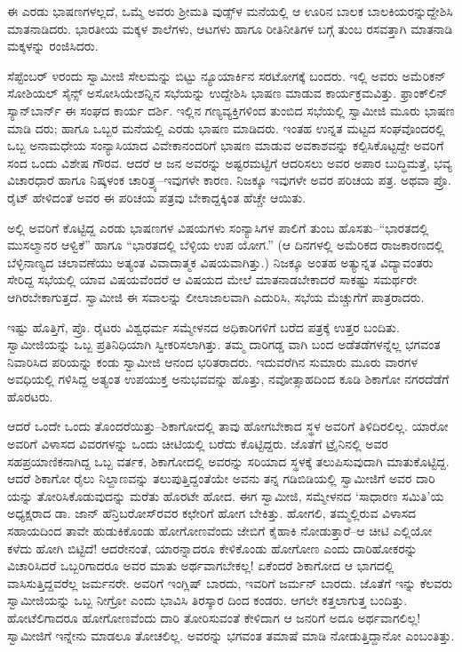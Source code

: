 ಈ ಎರಡು ಭಾಷಣಗಳಲ್ಲದೆ, ಒಮ್ಮೆ ಅವರು ಶ್ರೀಮತಿ ವುಡ್ಸ್​ಳ ಮನೆಯಲ್ಲಿ ಆ ಊರಿನ ಬಾಲಕ ಬಾಲಕಿಯರನ್ನುದ್ದೇಶಿಸಿ ಮಾತನಾಡಿದರು. ಭಾರತೀಯ ಮಕ್ಕಳ ಶಾಲೆಗಳು, ಆಟಗಳು ಹಾಗೂ ರೀತಿನೀತಿಗಳ ಬಗ್ಗೆ ತುಂಬ ರಸವತ್ತಾಗಿ ಮಾತನಾಡಿ ಮಕ್ಕಳನ್ನು ರಂಜಿಸಿದರು.

ಸೆಪ್ಟೆಂಬರ್ ೪ರಂದು ಸ್ವಾಮೀಜಿ ಸೇಲಮನ್ನು ಬಿಟ್ಟು ನ್ಯೂಯಾರ್ಕಿನ ಸರಟೋಗಕ್ಕೆ ಬಂದರು. ಇಲ್ಲಿ ಅವರು ಅಮೆರಿಕನ್ ಸೋಶಿಯಲ್ ಸೈನ್ಸ್ ಅಸೋಸಿಯೇಶನ್ನಿನ ಸಭೆಯನ್ನು ಉದ್ದೇಶಿಸಿ ಭಾಷಣ ಮಾಡುವ ಕಾರ್ಯಕ್ರಮವಿತ್ತು. ಫ್ರಾಂಕ್​ಲಿನ್ ಸ್ಯಾನ್​ಬಾರ್ನ್ ಈ ಸಂಘದ ಕಾರ್ಯ ದರ್ಶಿ. ಇಲ್ಲಿನ ಗಣ್ಯವ್ಯಕ್ತಿಗಳಿಂದ ತುಂಬಿದ ಸಭೆಯಲ್ಲಿ ಸ್ವಾಮೀಜಿ ಮೂರು ಭಾಷಣ ಮಾಡಿ ದರು; ಹಾಗೂ ಒಬ್ಬರ ಮನೆಯಲ್ಲಿ ಎರಡು ಭಾಷಣ ಮಾಡಿದರು. ಇಂತಹ ಉನ್ನತ ಮಟ್ಟದ ಸಂಘವೊಂದರಲ್ಲಿ ಒಬ್ಬ ಅನಾಮಧೇಯ ಸಂನ್ಯಾಸಿಯಾದ ವಿವೇಕಾನಂದರಿಗೆ ಭಾಷಣ ಮಾಡುವ ಅವಕಾಶವನ್ನು ಕಲ್ಪಿಸಿಕೊಟ್ಟದ್ದೇ ಅವರಿಗೆ ಸಂದ ಒಂದು ವಿಶೇಷ ಗೌರವ. ಆದರೆ ಆ ಜನ ಅವರನ್ನು ಅಷ್ಟರಮಟ್ಟಿಗೆ ಆದರಿಸಲು ಅವರ ಅಪಾರ ಬುದ್ಧಿಮತ್ತೆ, ಭವ್ಯ ವಿಚಾರಧಾರೆ ಹಾಗೂ ನಿಷ್ಕಳಂಕ ಚಾರಿತ್ರ್ಯ–ಇವುಗಳೇ ಕಾರಣ. ನಿಜಕ್ಕೂ ಇವುಗಳೇ ಅವರ ಪರಿಚಯ ಪತ್ರ. ಅಥವಾ ಪ್ರೊ. ರೈಟ್ ಹೇಳಿದಂತೆ ಅವರ ಈ ಪರಿಚಯ ಪತ್ರವು ಬೇಕಾದ್ದಕ್ಕಿಂತ ಹೆಚ್ಚೇ ಆಯಿತು.

ಅಲ್ಲಿ ಅವರಿಗೆ ಕೊಟ್ಟಿದ್ದ ಎರಡು ಭಾಷಣಗಳ ವಿಷಯಗಳು ಸಂನ್ಯಾಸಿಗಳ ಪಾಲಿಗೆ ತುಂಬ ಹೊಸತು–“ಭಾರತದಲ್ಲಿ ಮುಸಲ್ಮಾನರ ಆಳ್ವಿಕೆ” ಹಾಗೂ “ಭಾರತದಲ್ಲಿ ಬೆಳ್ಳಿಯ ಉಪ ಯೋಗ.” (ಆ ದಿನಗಳಲ್ಲಿ ಅಮೆರಿಕದ ರಾಜಕಾರಣದಲ್ಲಿ ಬೆಳ್ಳಿನಾಣ್ಯದ ಚಲಾವಣೆಯು ಅತ್ಯಂತ ವಿವಾದಾತ್ಮಕ ವಿಷಯವಾಗಿತ್ತು.) ನಿಜಕ್ಕೂ ಅಂತಹ ಅತ್ಯುನ್ನತ ವಿದ್ಯಾವಂತರು ಸೇರಿದ್ದ ಸಭೆಯಲ್ಲಿ ಯಾವ ವಿಷಯವೆಂದರೆ ಆ ವಿಷಯದ ಮೇಲೆ ಮಾತನಾಡಬೇಕಾದರೆ ಸಾಕಷ್ಟು ಸಮರ್ಥರೇ ಆಗಿರಬೇಕಾಗುತ್ತದೆ. ಸ್ವಾಮೀಜಿ ಈ ಸವಾಲನ್ನು ಲೀಲಾಜಾಲವಾಗಿ ಎದುರಿಸಿ, ಸಭೆಯ ಮೆಚ್ಚುಗೆಗೆ ಪಾತ್ರರಾದರು.

ಇಷ್ಟು ಹೊತ್ತಿಗೆ, ಪ್ರೊ. ರೈಟರು ವಿಶ್ವಧರ್ಮ ಸಮ್ಮೇಳನದ ಅಧಿಕಾರಿಗಳಿಗೆ ಬರೆದ ಪತ್ರಕ್ಕೆ ಉತ್ತರ ಬಂದಿತು. ಸ್ವಾಮೀಜಿಯನ್ನು ಒಬ್ಬ ಪ್ರತಿನಿಧಿಯಾಗಿ ಸ್ವೀಕರಿಸಲಾಗಿತ್ತು. ತಮ್ಮ ದಾರಿಗಡ್ಡ ವಾಗಿ ಬಂದ ಅಡೆತಡೆಗಳನ್ನೆಲ್ಲ ಭಗವಂತ ನಿವಾರಿಸಿದ ಪರಿಯನ್ನು ಕಂಡು ಸ್ವಾಮೀಜಿ ಆನಂದ ಭರಿತರಾದರು. ಇದುವರೆಗಿನ ಸುಮಾರು ಮೂರು ವಾರಗಳ ಅವಧಿಯಲ್ಲಿ ಗಳಿಸಿದ್ದ ಅತ್ಯಂತ ಉಪಯುಕ್ತ ಅನುಭವವನ್ನು ಹೊತ್ತು, ನವೋತ್ಸಾಹದಿಂದ ಕೂಡಿ ಶಿಕಾಗೋ ನಗರದೆಡೆಗೆ ಹೊರಟರು.

ಆದರೆ ಒಂದೇ ಒಂದು ತೊಂದರೆಯಿತ್ತು–ಶಿಕಾಗೋದಲ್ಲಿ ತಾವು ಹೋಗಬೇಕಾದ ಸ್ಥಳ ಅವರಿಗೆ ತಿಳಿದಿರಲಿಲ್ಲ. ಯಾರೋ ಅವರಿಗೆ ವಿಳಾಸದ ವಿವರಗಳನ್ನು ಒಂದು ಚೀಟಿಯಲ್ಲಿ ಬರೆದು ಕೊಟ್ಟಿದ್ದರು. ಜೊತೆಗೆ ಟ್ರೈನಿನಲ್ಲಿ ಅವರ ಸಹಪ್ರಯಾಣಿಕನಾಗಿದ್ದ ಒಬ್ಬ ವರ್ತಕ, ಶಿಕಾಗೋದಲ್ಲಿ ಅವರನ್ನು ಸರಿಯಾದ ಸ್ಥಳಕ್ಕೆ ತಲುಪಿಸುವುದಾಗಿ ಮಾತುಕೊಟ್ಟಿದ್ದ. ಆದರೆ ಶಿಕಾಗೋ ರೈಲು ನಿಲ್ದಾಣವನ್ನು ತಲುಪುತ್ತಿದ್ದಂತೆಯೇ ಅವನು ತನ್ನ ಗಡಿಬಿಡಿಯಲ್ಲಿ ಸ್ವಾಮೀಜಿಗೆ ಅವರ ದಾರಿ ಯನ್ನು ತೋರಿಸಿಕೊಡುವುದನ್ನು ಮರೆತು ಹೊರಟೇ ಹೋದ. ಈಗ ಸ್ವಾಮೀಜಿ, ಸಮ್ಮೇಳನದ ‘ಸಾಧಾರಣ ಸಮಿತಿ’ಯ ಅಧ್ಯಕ್ಷರಾದ ಡಾ. ಜಾನ್ ಹೆನ್ರಿಬರೋಸ್​ರವರ ಕಛೇರಿಗೆ ಹೋಗ ಬೇಕಿತ್ತು. ಹೋಗಲಿ, ತಮ್ಮಲ್ಲಿರುವ ವಿಳಾಸದ ಸಹಾಯದಿಂದ ತಾವೇ ಹುಡುಕಿಕೊಂಡು ಹೋಗೋಣವೆಂದು ಜೇಬಿಗೆ ಕೈಹಾಕಿ ನೋಡುತ್ತಾರೆ–ಆ ಚೀಟಿ ಎಲ್ಲಿಯೋ ಕಳೆದು ಹೋಗಿ ಬಿಟ್ಟಿದೆ! ಆದರೇನಂತೆ, ಯಾರನ್ನಾದರೂ ಕೇಳಿಕೊಂಡು ಹೋಗೋಣ ಎಂದು ದಾರಿಹೋಕರನ್ನು ವಿಚಾರಿಸಿದರೆ ಒಬ್ಬರಿಗಾದರೂ ಅವರ ಮಾತು ಅರ್ಥವಾಗಬೇಕಲ್ಲ! ಏಕೆಂದರೆ ಶಿಕಾಗೋದ ಆ ಭಾಗದಲ್ಲಿ ವಾಸಿಸುತ್ತಿದ್ದವರೆಲ್ಲ ಜರ್ಮನರೇ. ಅವರಿಗೆ ಇಂಗ್ಲಿಷ್ ಬಾರದು, ಇವರಿಗೆ ಜರ್ಮನ್ ಬಾರದು. ಜೊತೆಗೆ ಇನ್ನು ಕೆಲವರು ಸ್ವಾಮೀಜಿಯನ್ನು ಒಬ್ಬ ನೀಗ್ರೋ ಎಂದು ಭಾವಿಸಿ ತಿರಸ್ಕಾರ ದಿಂದ ಕಂಡರು. ಆಗಲೇ ಕತ್ತಲಾಗುತ್ತ ಬಂದಿತ್ತು. ಹೋಟೆಲಿಗಾದರೂ ಹೋಗೋಣವೆಂದು ದಾರಿ ತೋರಿಸುವಂತೆ ಕೇಳಿದಾಗ ಆ ಜನರಿಗೆ ಅದೂ ಅರ್ಥವಾಗಲಿಲ್ಲ! ಸ್ವಾಮೀಜಿಗೆ ಇನ್ನೇನು ಮಾಡಲೂ ತೋಚಲಿಲ್ಲ. ಅವರನ್ನು ಭಗವಂತ ತಮಾಷೆ ಮಾಡಿ ನೋಡುತ್ತಿದ್ದಾನೋ ಎಂಬಂತಿತ್ತು.

